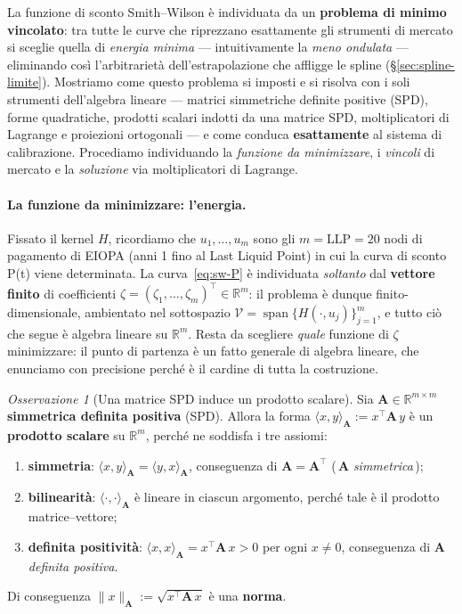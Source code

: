 \documentclass[11pt,a4paper]{article}
\theoremstyle{plain}
\theoremstyle{definition}
\theoremstyle{remark}
\newtheorem*{osservazione}{Osservazione}
\newcommand{\LLP}{\ensuremath{\mathrm{LLP}}}
\newcommand{\transp}{^{\!\top}}
\begin{document}
La funzione di sconto Smith--Wilson \`e individuata da un \textbf{problema di minimo
vincolato}: tra tutte le curve che riprezzano esattamente gli strumenti di mercato si
sceglie quella di \emph{energia minima} --- intuitivamente la \emph{meno ondulata} ---
eliminando cos\`i l'arbitrariet\`a dell'estrapolazione che affligge le spline
(§\ref{sec:spline-limite}). Mostriamo come questo problema si imposti e si
risolva con i soli strumenti dell'algebra lineare --- matrici simmetriche definite positive
(SPD), forme quadratiche, prodotti scalari indotti da una matrice SPD, moltiplicatori di
Lagrange e proiezioni ortogonali --- e come conduca \textbf{esattamente} al sistema di
calibrazione. Procediamo individuando la \emph{funzione da minimizzare}, i \emph{vincoli} di mercato
e la \emph{soluzione} via moltiplicatori di Lagrange.

\paragraph{La funzione da minimizzare: l'energia.}
Fissato il kernel $H$, ricordiamo che $u_1,\ldots,u_m$ sono gli $m=\LLP=20$ nodi di
pagamento di EIOPA (anni 1 fino al Last Liquid Point) in cui la curva di sconto P(t) viene
determinata. La curva~\eqref{eq:sw-P} \`e individuata \emph{soltanto} dal
\textbf{vettore finito} di coefficienti $\zeta = (\zeta_1,\dots,\zeta_m)\transp \in
\mathbb{R}^m$: il problema \`e dunque finito-dimensionale, ambientato nel sottospazio
$\mathcal{V} = \operatorname{span}\{H(\cdot,u_j)\}_{j=1}^{m}$, e tutto ci\`o che segue \`e
algebra lineare su $\mathbb{R}^m$. Resta da scegliere \emph{quale} funzione di $\zeta$
minimizzare: il punto di partenza \`e un fatto generale di algebra lineare, che enunciamo con
precisione perch\'e \`e il cardine di tutta la costruzione.

\begin{osservazione}[Una matrice SPD induce un prodotto scalare]
\label{oss:spd-prodotto}
Sia $\mathbf{A}\in\mathbb{R}^{m\times m}$ \textbf{simmetrica definita positiva} (SPD).
Allora la forma $\langle x,y\rangle_{\mathbf{A}} := x\transp \mathbf{A}\, y$ \`e un
\textbf{prodotto scalare} su $\mathbb{R}^m$, perch\'e ne soddisfa i tre assiomi:
\begin{enumerate}
  \item \textbf{simmetria}: $\langle x,y\rangle_{\mathbf{A}} = \langle y,x\rangle_{\mathbf{A}}$,
        conseguenza di $\mathbf{A} = \mathbf{A}\transp$ (\,$\mathbf{A}$ \emph{simmetrica}\,);
  \item \textbf{bilinearit\`a}: $\langle \cdot,\cdot\rangle_{\mathbf{A}}$ \`e lineare in
        ciascun argomento, perch\'e tale \`e il prodotto matrice--vettore;
  \item \textbf{definita positivit\`a}: $\langle x,x\rangle_{\mathbf{A}} = x\transp\mathbf{A}\,x > 0$
        per ogni $x\neq 0$, conseguenza di $\mathbf{A}$ \emph{definita positiva}.
\end{enumerate}
Di conseguenza $\|x\|_{\mathbf{A}} := \sqrt{x\transp \mathbf{A}\, x}$ \`e una \textbf{norma}.
\end{osservazione}
\end{document}

